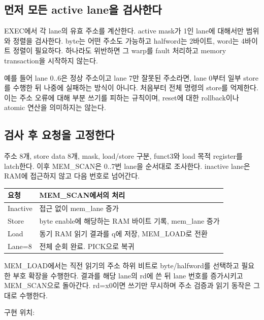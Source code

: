 \documentclass[a4paper,11pt]{article}
\newcommand{\source}[1]{\par{\small\color{teal}구현 위치: \urlstyle{same}\path{#1}}\par}
\begin{document}
\subsection{먼저 모든 active lane을 검사한다}
EXEC에서 각 lane의 유효 주소를 계산한다. active mask가 1인 lane에 대해서만 범위와 정렬을 검사한다. byte는 어떤 주소도 가능하고 halfword는 2바이트, word는 4바이트 정렬이 필요하다. 하나라도 위반하면 그 warp를 fault 처리하고 memory transaction을 시작하지 않는다.

예를 들어 lane 0..6은 정상 주소이고 lane 7만 잘못된 주소라면, lane 0부터 일부 store를 수행한 뒤 나중에 실패하는 방식이 아니다. 처음부터 전체 명령의 store를 억제한다. 이는 주소 오류에 대해 부분 쓰기를 피하는 규칙이며, reset에 대한 rollback이나 atomic 연산을 의미하지는 않는다.
\subsection{검사 후 요청을 고정한다}
주소 8개, store data 8개, mask, load/store 구분, funct3와 load 목적 register를 latch한다. 이후 MEM\_SCAN은 0..7번 lane을 순서대로 조사한다. inactive lane은 RAM에 접근하지 않고 다음 번호로 넘어간다.
\par\medskip
\begin{tabularx}{\linewidth}{p{25mm}Y}
\toprule 요청 & MEM\_SCAN에서의 처리 \\\midrule
Inactive & 접근 없이 mem\_lane 증가\\
Store & byte enable에 해당하는 RAM 바이트 기록, mem\_lane 증가\\
Load & 동기 RAM 읽기 결과를 q에 저장, MEM\_LOAD로 전환\\
Lane=8 & 전체 순회 완료. PICK으로 복귀\\
\bottomrule
\end{tabularx}
\par\medskip
MEM\_LOAD에서는 직전 읽기의 주소 하위 비트로 byte/halfword를 선택하고 필요한 부호 확장을 수행한다. 결과를 해당 lane의 rd에 쓴 뒤 lane 번호를 증가시키고 MEM\_SCAN으로 돌아간다. rd=x0이면 쓰기만 무시하며 주소 검증과 읽기 동작은 그대로 수행한다.
\source{rtl/simt_sm.sv}
\end{document}
